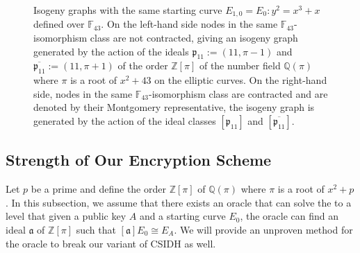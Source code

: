 \documentclass[openany, a4paper, 10pt]{book}
\theoremstyle{plain}
\theoremstyle{plain}
\theoremstyle{plain}
\theoremstyle{definition}
\theoremstyle{plain}
\theoremstyle{definition}
\theoremstyle{remark}
\begin{document}
\begin{figure}[!htb]
\begin{minipage}{.2\textwidth}
    \end{minipage}%
    \vspace{-.9em}
    \caption{
        Isogeny graphs with the same starting curve $E_{1,0} = E_{0}: y^2=x^3+x$ defined over $\mathbb F_{43}$.
        On the left-hand side nodes in the same $\mathbb F_{43}$-isomorphism class are not contracted, giving an isogeny graph generated by the action of the ideals $\mathfrak p_{11}:= (11, \pi-1)$ and $\overline{\mathfrak p_{11}}:= (11, \pi+1)$ of the order $\mathbb Z[\pi]$ of the number field $\mathbb Q(\pi)$ where $\pi$ is a root of $x^2+43$ on the elliptic curves.
        On the right-hand side, nodes in the same $\mathbb F_{43}$-isomorphism class are contracted and are denoted by their Montgomery representative, the isogeny graph is generated by the action of the ideal classes $[\mathfrak p_{11}]$ and $[\overline {\mathfrak p_{11}}]$.
    }%
    \label{isog_graph2}
    \vspace{-.9em}
\end{figure}


\subsection{Strength of Our Encryption Scheme}
Let $p$ be a prime and define the order $\mathbb Z[\pi]$ of $\mathbb Q(\pi)$ where $\pi$ is a root of $x^2+p$.
In this subsection, we assume that there exists an oracle that can solve the  to a level that given a public key $A$ and a starting curve $E_0$, the oracle can find an ideal $\mathfrak a$ of $\mathbb Z[\pi]$ such that $[\mathfrak a]E_0 \cong E_A$.
We will provide an unproven method for the oracle to break our variant of CSIDH as well.
\end{document}
